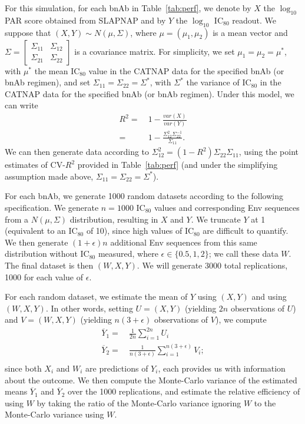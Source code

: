 \documentclass[10pt]{article}
\begin{document}
For this simulation, for each bnAb in Table~\ref{tab:perf}, we denote by $X$ the $\log_{10}$ PAR score obtained from SLAPNAP and by $Y$ the $\log_{10}$ IC$_{80}$ readout. We suppose that $(X,Y) \sim N(\mu, \Sigma)$, where $\mu = (\mu_1, \mu_2)$ is a mean vector and $\Sigma = \begin{bmatrix} \Sigma_{11} & \Sigma_{12} \\ \Sigma_{21} & \Sigma_{22} \end{bmatrix}$ is a covariance matrix. For simplicity, we set $\mu_1 = \mu_2 = \mu^*$, with $\mu^*$ the mean IC$_{80}$ value in the CATNAP data for the specified bnAb (or bnAb regimen), and set $\Sigma_{11} = \Sigma_{22} = \Sigma^*$, with $\Sigma^*$ the variance of IC$_{80}$ in the CATNAP data for the specified bnAb (or bnAb regimen). Under this model, we can write
\begin{align*}
    R^2 =& \ 1 - \frac{var(X)}{var(Y)} \\
    =& \ 1 - \frac{\Sigma_{12}^2\Sigma_{22}^{-1}}{\Sigma_{11}}.
\end{align*}
We can then generate data according to $\Sigma_{12}^2 = (1 - R^2)\Sigma_{22}\Sigma_{11}$, using the point estimates of CV-$R^2$ provided in Table~\ref{tab:perf} (and under the simplifying assumption made above, $\Sigma_{11} = \Sigma_{22} = \Sigma^*$).

For each bnAb, we generate 1000 random datasets according to the following specification. We generate $n = 1000$ IC$_{80}$ values and corresponding Env sequences from a $N(\mu, \Sigma)$ distribution, resulting in $X$ and $Y$. We truncate $Y$ at 1 (equivalent to an IC$_{80}$ of 10), since high values of IC$_{80}$ are difficult to quantify. We then generate $(1 + \epsilon)n$ additional Env sequences from this same distribution without IC$_{80}$ measured, where $\epsilon \in \{0.5, 1, 2\}$; we call these data $W$. The final dataset is then $(W, X, Y)$. We will generate 3000 total replications, 1000 for each value of $\epsilon$.

For each random dataset, we estimate the mean of $Y$ using $(X,Y)$ and using $(W,X,Y)$. In other words, setting $U = (X,Y)$ (yielding $2n$ observations of $U$) and $V = (W,X,Y)$ (yielding $n(3 + \epsilon)$ observations of $V$), we compute
\begin{align*}
    \overline{Y}_1 =& \ \frac{1}{2n}\sum_{i=1}^{2n}U_i \\
    \overline{Y}_2 =& \ \frac{1}{n(3 + \epsilon)}\sum_{i=1}^{n(3 + \epsilon)}V_i;\\
\end{align*}
since both $X_i$ and $W_i$ are predictions of $Y_i$, each provides us with information about the outcome. We then compute the Monte-Carlo variance of the estimated means $\overline{Y}_1$ and $\overline{Y}_2$ over the 1000 replications, and estimate the relative efficiency of using $W$ by taking the ratio of the Monte-Carlo variance ignoring $W$ to the Monte-Carlo variance using $W$.
\end{document}
